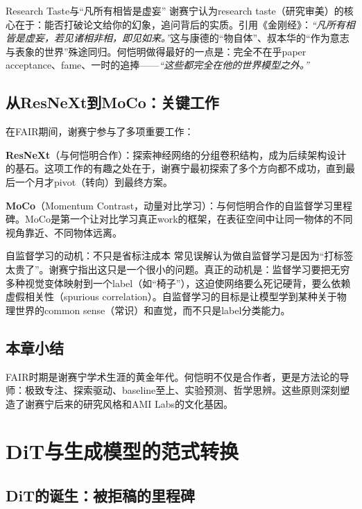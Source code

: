 \documentclass[a4paper]{article}
\begin{document}
\begin{importantbox}{Research Taste与``凡所有相皆是虚妄''}
谢赛宁认为research taste（研究审美）的核心在于：能否打破论文给你的幻象，追问背后的实质。引用《金刚经》：\textit{``凡所有相皆是虚妄，若见诸相非相，即见如来。''}这与康德的``物自体''、叔本华的``作为意志与表象的世界''殊途同归。何恺明做得最好的一点是：完全不在乎paper acceptance、fame、一时的追捧——\textit{``这些都完全在他的世界模型之外。''}
\end{importantbox}

\subsection{从ResNeXt到MoCo：关键工作}

在FAIR期间，谢赛宁参与了多项重要工作：

\textbf{ResNeXt}（与何恺明合作）：探索神经网络的分组卷积结构，成为后续架构设计的基石。这项工作的有趣之处在于，谢赛宁最初探索了多个方向都不成功，直到最后一个月才pivot（转向）到最终方案。

\textbf{MoCo}（Momentum Contrast，动量对比学习）：与何恺明合作的自监督学习里程碑。MoCo是第一个让对比学习真正work的框架，在表征空间中让同一物体的不同视角靠近、不同物体远离。

\begin{knowledgebox}{自监督学习的动机：不只是省标注成本}
常见误解认为做自监督学习是因为``打标签太贵了''。谢赛宁指出这只是一个很小的问题。真正的动机是：监督学习要把无穷多种视觉变体映射到一个label（如``椅子''），这迫使网络要么死记硬背，要么依赖虚假相关性（spurious correlation）。自监督学习的目标是让模型学到某种关于物理世界的common sense（常识）和直觉，而不只是label分类能力。
\end{knowledgebox}

\subsection{本章小结}

FAIR时期是谢赛宁学术生涯的黄金年代。何恺明不仅是合作者，更是方法论的导师：极致专注、探索驱动、baseline至上、实验预测、哲学思辨。这些原则深刻塑造了谢赛宁后来的研究风格和AMI Labs的文化基因。

\section{DiT与生成模型的范式转换}

\subsection{DiT的诞生：被拒稿的里程碑}
\end{document}

